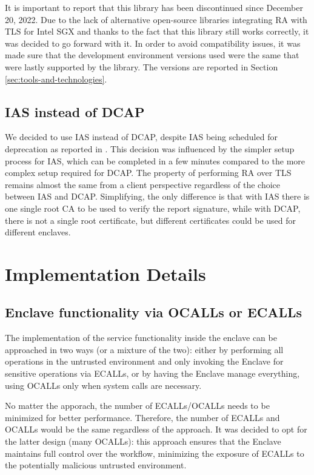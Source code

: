 It is important to report that this library has been discontinued since December 20, 2022. Due to the lack of alternative open-source libraries integrating RA with TLS for Intel SGX and thanks to the fact that this library still works correctly, it was decided to go forward with it.
In order to avoid compatibility issues, it was made sure that the development environment versions used were the same that were lastly supported by the library. The versions are reported in Section \ref{sec:tools-and-technologies}.

\subsection{IAS instead of DCAP}
We decided to use IAS instead of DCAP, despite IAS being scheduled for deprecation as reported in \cite{intelSGX-IAS-EOL}. This decision was influenced by the simpler setup process for IAS, which can be completed in a few minutes compared to the more complex setup required for DCAP. The property of performing RA over TLS remains almost the same from a client perspective regardless of the choice between IAS and DCAP. Simplifying, the only difference is that with IAS there is one single root CA to be used to verify the report signature, while with DCAP, there is not a single root certificate, but different certificates could be used for different enclaves.

\section{Implementation Details}

\subsection{Enclave functionality via OCALLs or ECALLs}
The implementation of the service functionality inside the enclave can be approached in two ways (or a mixture of the two): either by performing all operations in the untrusted environment and only invoking the Enclave for sensitive operations via ECALLs, or by having the Enclave manage everything, using OCALLs only when system calls are necessary.

No matter the apporach, the number of ECALLs/OCALLs needs to be minimized for better performance. Therefore, the number of ECALLs and OCALLs would be the same regardless of the approach. It was decided to opt for the latter design (many OCALLs): this approach ensures that the Enclave maintains full control over the workflow, minimizing the exposure of ECALLs to the potentially malicious untrusted environment.

